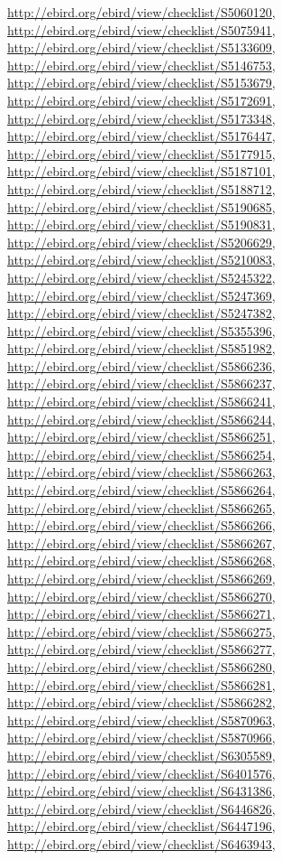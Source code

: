 \documentclass[9pt, article]{memoir}
\begin{document}
\begin{multicols}{2}
\url{http://ebird.org/ebird/view/checklist/S5060120}, 
\url{http://ebird.org/ebird/view/checklist/S5075941}, 
\url{http://ebird.org/ebird/view/checklist/S5133609}, 
\url{http://ebird.org/ebird/view/checklist/S5146753}, 
\url{http://ebird.org/ebird/view/checklist/S5153679}, 
\url{http://ebird.org/ebird/view/checklist/S5172691}, 
\url{http://ebird.org/ebird/view/checklist/S5173348}, 
\url{http://ebird.org/ebird/view/checklist/S5176447}, 
\url{http://ebird.org/ebird/view/checklist/S5177915}, 
\url{http://ebird.org/ebird/view/checklist/S5187101}, 
\url{http://ebird.org/ebird/view/checklist/S5188712}, 
\url{http://ebird.org/ebird/view/checklist/S5190685}, 
\url{http://ebird.org/ebird/view/checklist/S5190831}, 
\url{http://ebird.org/ebird/view/checklist/S5206629}, 
\url{http://ebird.org/ebird/view/checklist/S5210083}, 
\url{http://ebird.org/ebird/view/checklist/S5245322}, 
\url{http://ebird.org/ebird/view/checklist/S5247369}, 
\url{http://ebird.org/ebird/view/checklist/S5247382}, 
\url{http://ebird.org/ebird/view/checklist/S5355396}, 
\url{http://ebird.org/ebird/view/checklist/S5851982}, 
\url{http://ebird.org/ebird/view/checklist/S5866236}, 
\url{http://ebird.org/ebird/view/checklist/S5866237}, 
\url{http://ebird.org/ebird/view/checklist/S5866241}, 
\url{http://ebird.org/ebird/view/checklist/S5866244}, 
\url{http://ebird.org/ebird/view/checklist/S5866251}, 
\url{http://ebird.org/ebird/view/checklist/S5866254}, 
\url{http://ebird.org/ebird/view/checklist/S5866263}, 
\url{http://ebird.org/ebird/view/checklist/S5866264}, 
\url{http://ebird.org/ebird/view/checklist/S5866265}, 
\url{http://ebird.org/ebird/view/checklist/S5866266}, 
\url{http://ebird.org/ebird/view/checklist/S5866267}, 
\url{http://ebird.org/ebird/view/checklist/S5866268}, 
\url{http://ebird.org/ebird/view/checklist/S5866269}, 
\url{http://ebird.org/ebird/view/checklist/S5866270}, 
\url{http://ebird.org/ebird/view/checklist/S5866271}, 
\url{http://ebird.org/ebird/view/checklist/S5866275}, 
\url{http://ebird.org/ebird/view/checklist/S5866277}, 
\url{http://ebird.org/ebird/view/checklist/S5866280}, 
\url{http://ebird.org/ebird/view/checklist/S5866281}, 
\url{http://ebird.org/ebird/view/checklist/S5866282}, 
\url{http://ebird.org/ebird/view/checklist/S5870963}, 
\url{http://ebird.org/ebird/view/checklist/S5870966}, 
\url{http://ebird.org/ebird/view/checklist/S6305589}, 
\url{http://ebird.org/ebird/view/checklist/S6401576}, 
\url{http://ebird.org/ebird/view/checklist/S6431386}, 
\url{http://ebird.org/ebird/view/checklist/S6446826}, 
\url{http://ebird.org/ebird/view/checklist/S6447196}, 
\url{http://ebird.org/ebird/view/checklist/S6463943}, 

\end{multicols}
\end{document}
